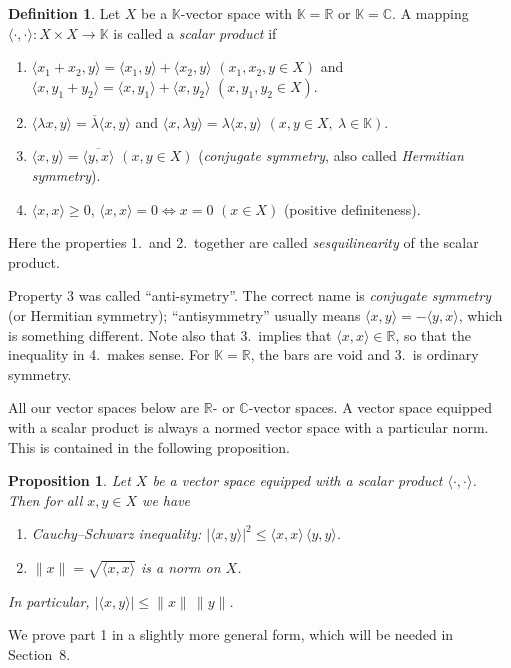 \documentclass[11pt,a4paper]{article}
\numberwithin{equation}{section}
\newcommand{\R}{\mathbb{R}}
\newcommand{\C}{\mathbb{C}}
\newcommand{\K}{\mathbb{K}}
\newcommand{\ip}[2]{\langle #1, #2\rangle}
\newcommand{\conj}[1]{\overline{#1}}
\theoremstyle{plain}
\newtheorem{proposition}[theorem]{Proposition}
\theoremstyle{definition}
\newtheorem{definition}[theorem]{Definition}
\theoremstyle{plain}
\theoremstyle{definition}
\begin{document}
\begin{definition}\label{def:sp}
Let $X$ be a $\K$-vector space with $\K=\R$ or $\K=\C$. A mapping
$\ip{\cdot}{\cdot}:X\times X\to\K$ is called a \emph{scalar product} if
\begin{enumerate}
\item $\ip{x_1+x_2}{y}=\ip{x_1}{y}+\ip{x_2}{y}$ $(x_1,x_2,y\in X)$ and
      $\ip{x}{y_1+y_2}=\ip{x}{y_1}+\ip{x}{y_2}$ $(x,y_1,y_2\in X)$.
\item $\ip{\lambda x}{y}=\conj{\lambda}\ip{x}{y}$ and $\ip{x}{\lambda y}=\lambda\ip{x}{y}$
      $(x,y\in X,\ \lambda\in\K)$.
\item $\ip{x}{y}=\conj{\ip{y}{x}}$ $(x,y\in X)$ (\emph{conjugate symmetry}, also called
      \emph{Hermitian symmetry}).
\item $\ip{x}{x}\geqslant0$, $\ip{x}{x}=0\iff x=0$ $(x\in X)$ (positive definiteness).
\end{enumerate}
Here the properties 1.\ and 2.\ together are called \emph{sesquilinearity} of the scalar product.
\end{definition}

\begin{correction}[(Def.~1.6)]
Property 3 was called ``anti-symetry''. The correct name is \emph{conjugate symmetry}
(or Hermitian symmetry); ``antisymmetry'' usually means $\ip{x}{y}=-\ip{y}{x}$, which is
something different. Note also that 3.\ implies that $\ip{x}{x}\in\R$, so that the
inequality in 4.\ makes sense. For $\K=\R$, the bars are void and 3.\ is ordinary symmetry.
\end{correction}

All our vector spaces below are $\R$- or $\C$-vector spaces. A vector space equipped with a
scalar product is always a normed vector space with a particular norm. This is contained
in the following proposition.

\begin{proposition}\label{prop:CS}
Let $X$ be a vector space equipped with a scalar product $\ip{\cdot}{\cdot}$. Then for all
$x,y\in X$ we have
\begin{enumerate}
\item Cauchy--Schwarz inequality: $|\ip{x}{y}|^2\leqslant\ip{x}{x}\,\ip{y}{y}$.
\item $\|x\|=\sqrt{\ip{x}{x}}$ is a norm on $X$.
\end{enumerate}
In particular, $|\ip{x}{y}|\leqslant\|x\|\,\|y\|$.
\end{proposition}

We prove part 1 in a slightly more general form, which will be needed in Section~8.
\end{document}
